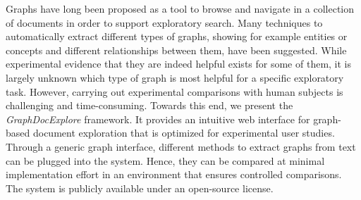 Graphs have long been proposed as a tool to browse and navigate in a collection of documents in order to support exploratory search. Many techniques to automatically extract different types of graphs, showing for example entities or concepts and different relationships between them, have been suggested. While experimental evidence that they are indeed helpful exists for some of them, it is largely unknown which type of graph is most helpful for a specific exploratory task. However, carrying out experimental comparisons with human subjects is challenging and time-consuming. Towards this end, we present the \textit{GraphDocExplore} framework. It provides an intuitive web interface for graph-based document exploration that is optimized for experimental user studies. Through a generic graph interface, different methods to extract graphs from text can be plugged into the system. Hence, they can be compared at minimal implementation effort in an environment that ensures controlled comparisons. The system is publicly available under an open-source license.
